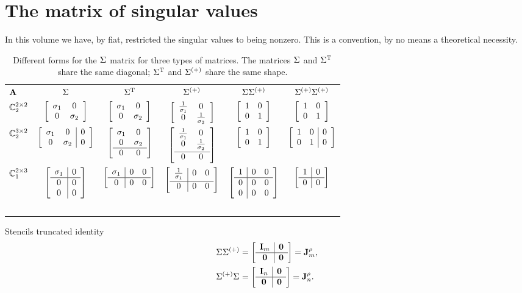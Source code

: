 \section{The matrix of singular values}

In this volume we have, by fiat, restricted the singular values to being nonzero. This is a convention, by no means a theoretical necessity.


\begin{table}[htdp]
\begin{center}
\begin{tabular}{lccc|cc}
  $\A{}$ & $\sig{}$ & $\sig{T}$ & $\sig{(+)}$ & $\sig{}\sig{(+)}$ & $\sig{(+)}\sig{(+)}$\\
  $\cmplx{\bys{2}}_{2}$ &
  $\mat{cc}{\sigma_{1}&0\\0&\sigma_{2}}$ & 
  $\mat{cc}{\sigma_{1}&0\\0&\sigma_{2}}$ & 
  $\mat{cc}{\frac{1}{\sigma_{1}}&0\\0&\frac{1}{\sigma_{2}}}$ & $\itwo$ & 
  $\itwo$\\ 
  $\cmplx{\by{3}{2}}_{2}$ &
  $\mat{cc|c}{\sigma_{1}&0&0\\0&\sigma_{2}&0}$ & 
  $\mat{cc}{\sigma_{1}&0\\0&\sigma_{2}\\\hline 0&0}$ & 
  $\mat{cc}{\frac{1}{\sigma_{1}}&0\\0&\frac{1}{\sigma_{2}}\\[3pt]\hline 0&0}$ &
  $\itwo$ & 
  $\mat{cc|c}{1&0&0\\0&1&0}$\\
  $\cmplx{\by{2}{3}}_{1}$ &
  $\mat{c|c}{\sigma_{1}&0\\\hline0&0\\0&0}$ & 
  $\mat{c|cc}{\sigma_{1}&0&0\\\hline0&0&0}$ & 
  $\mat{c|cc}{\frac{1}{\sigma_{1}}&0&0\\[3pt]\hline0&0&0}$ &
  $\mat{c|cc}{1&0&0\\\hline0&0&0\\0&0&0}$ & 
  $\mat{c|c}{1&0\\\hline0&0}$ \\
  \ \\
\end{tabular}
\end{center}
\caption{Different forms for the $\sig{}$ matrix for three types of matrices. The matrices $\sig{}$ and $\sig{T}$ share the same diagonal; $\sig{T}$ and $\sig{(+)}$ share the same shape.}
\label{tab:sing}
\end{table}%

Stencils
truncated identity
\begin{equation}
  \begin{split}
    \sig{}\sig{(+)} &= \mat{c|c}{\I{m}&\zero\\\hline\zero&\zero} = \J{m}{\rho}, \\
    \sig{(+)}\sig{} &= \mat{c|c}{\I{n}&\zero\\\hline\zero&\zero} = \J{n}{\rho}.
  \end{split}
\end{equation}


\endinput